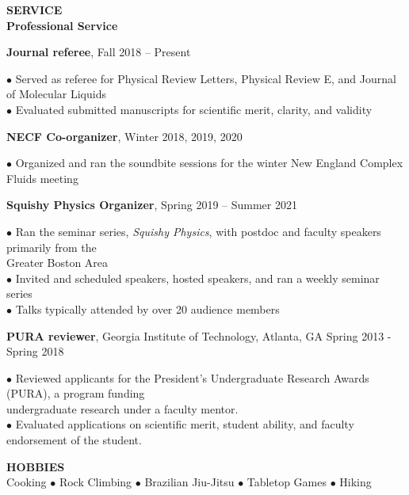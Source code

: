 \documentclass[10pt]{article}
\newenvironment{changemargin}[2]{%
  \list{}{\rightmargin#2\leftmargin#1
    \parsep=0pt\topsep=1pt\partopsep=0pt}
\item[]} {\endlist}
\newenvironment{indentmore}{\begin{changemargin}{10pt}{0cm}}{\end{changemargin}}
\begin{document}
\textbf{\large SERVICE}\\
{\bf Professional Service}
\begin{indentmore}
{\bf Journal referee}, \hfill Fall 2018 -- Present
\begin{indentmore}
$\bullet$ Served as referee for Physical Review Letters, Physical Review E, and Journal of Molecular Liquids\\
$\bullet$ Evaluated submitted manuscripts for scientific merit, clarity, and validity\\
\end{indentmore}

{\bf NECF Co-organizer}, \hfill Winter 2018, 2019, 2020
\begin{indentmore}
$\bullet$ Organized and ran the soundbite sessions for the winter New England Complex Fluids meeting\\
\end{indentmore}

{\bf Squishy Physics Organizer}, \hfill Spring 2019 -- Summer 2021
\begin{indentmore}
$\bullet$ Ran the seminar series, \emph{Squishy Physics}, with postdoc and faculty speakers primarily from the \\ \hspace*{5pt} Greater Boston Area\\
$\bullet$ Invited and scheduled speakers, hosted speakers, and ran a weekly seminar series\\
$\bullet$ Talks typically attended by over 20 audience members\\
\end{indentmore}

{\bf PURA reviewer}, Georgia Institute of Technology, Atlanta, GA \hfill Spring 2013 - Spring 2018
\begin{indentmore}
$\bullet$ Reviewed applicants for the President's Undergraduate Research Awards (PURA), a program funding \\ \hspace*{5pt} undergraduate research under a faculty mentor.\\
$\bullet$ Evaluated applications on scientific merit, student ability, and faculty endorsement of the student.\\
\end{indentmore}
\end{indentmore}



\textbf{\large HOBBIES} \\
 Cooking $\bullet$ Rock Climbing $\bullet$ Brazilian Jiu-Jitsu $\bullet$  Tabletop Games $\bullet$ Hiking
\end{document}
